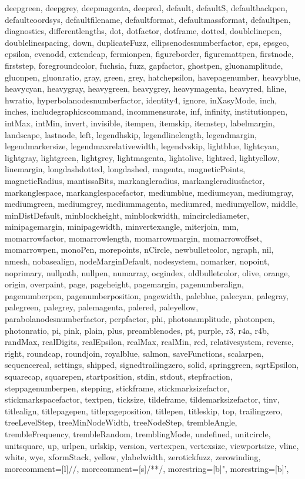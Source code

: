 {{  deepgreen, deepgrey, deepmagenta, deepred, default, defaultS,
  defaultbackpen, defaultcoordsys, defaultfilename, defaultformat,
  defaultmassformat, defaultpen, diagnostics, differentlengths, dot,
  dotfactor, dotframe, dotted, doublelinepen, doublelinespacing, down,
  duplicateFuzz, ellipsenodesnumberfactor, eps, epsgeo, epsilon, evenodd,
  extendcap, fermionpen, figureborder, figuremattpen, firstnode, firststep,
  foregroundcolor, fuchsia, fuzz, gapfactor, ghostpen, gluonamplitude,
  gluonpen, gluonratio, gray, green, grey, hatchepsilon, havepagenumber,
  heavyblue, heavycyan, heavygray, heavygreen, heavygrey, heavymagenta,
  heavyred, hline, hwratio, hyperbolanodesnumberfactor, identity4, ignore,
  inXasyMode, inch, inches, includegraphicscommand, incommensurate, inf,
  infinity, institutionpen, intMax, intMin, invert, invisible, itempen,
  itemskip, itemstep, labelmargin, landscape, lastnode, left, legendhskip,
  legendlinelength, legendmargin, legendmarkersize, legendmaxrelativewidth,
  legendvskip, lightblue, lightcyan, lightgray, lightgreen, lightgrey,
  lightmagenta, lightolive, lightred, lightyellow, linemargin,
  longdashdotted, longdashed, magenta, magneticPoints, magneticRadius,
  mantissaBits, markangleradius, markangleradiusfactor, markanglespace,
  markanglespacefactor, mediumblue, mediumcyan, mediumgray, mediumgreen,
  mediumgrey, mediummagenta, mediumred, mediumyellow, middle, minDistDefault,
  minblockheight, minblockwidth, mincirclediameter, minipagemargin,
  minipagewidth, minvertexangle, miterjoin, mm, momarrowfactor,
  momarrowlength, momarrowmargin, momarrowoffset, momarrowpen, monoPen,
  morepoints, nCircle, newbulletcolor, ngraph, nil, nmesh, nobasealign,
  nodeMarginDefault, nodesystem, nomarker, nopoint, noprimary, nullpath,
  nullpen, numarray, ocgindex, oldbulletcolor, olive, orange, origin,
  overpaint, page, pageheight, pagemargin, pagenumberalign, pagenumberpen,
  pagenumberposition, pagewidth, paleblue, palecyan, palegray, palegreen,
  palegrey, palemagenta, palered, paleyellow, parabolanodesnumberfactor,
  perpfactor, phi, photonamplitude, photonpen, photonratio, pi, pink, plain,
  plus, preamblenodes, pt, purple, r3, r4a, r4b, randMax, realDigits,
  realEpsilon, realMax, realMin, red, relativesystem, reverse, right,
  roundcap, roundjoin, royalblue, salmon, saveFunctions, scalarpen,
  sequencereal, settings, shipped, signedtrailingzero, solid, springgreen,
  sqrtEpsilon, squarecap, squarepen, startposition, stdin, stdout,
  stepfraction, steppagenumberpen, stepping, stickframe, stickmarksizefactor,
  stickmarkspacefactor, textpen, ticksize, tildeframe, tildemarksizefactor,
  tinv, titlealign, titlepagepen, titlepageposition, titlepen, titleskip,
  top, trailingzero, treeLevelStep, treeMinNodeWidth, treeNodeStep,
  trembleAngle, trembleFrequency, trembleRandom, tremblingMode, undefined,
  unitcircle, unitsquare, up, urlpen, urlskip, version, vertexpen,
  vertexsize, viewportsize, vline, white, wye, xformStack, yellow,
  ylabelwidth, zerotickfuzz, zerowinding},
  morecomment=[l]{//},%
  morecomment=[s]{/*}{*/},%
  morestring=[b]",%
  morestring=[b]',%
}

